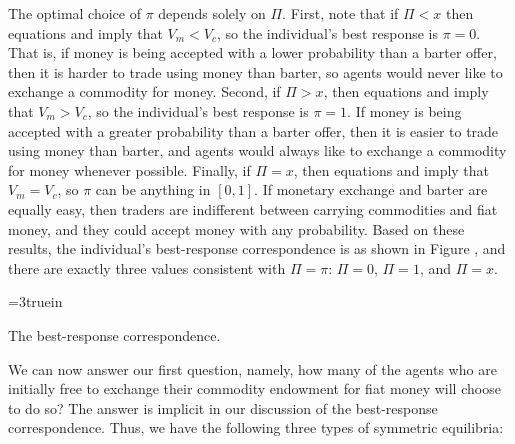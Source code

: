 The optimal choice of $\pi$ depends solely on $\Pi$. First, note
that if $\Pi<x$ then equations  and  imply that $V_m<V_c$,
so the individual's best response is $\pi=0$. That is, if money
is being accepted with a lower probability than a barter offer,
then it is harder to trade using money than barter, so agents
would never like to exchange a commodity for money. Second, if
$\Pi>x$, then equations  and  imply that $V_m>V_c$, so the
individual's best response is $\pi=1$. If money is being accepted
with a greater probability than a barter offer, then it is easier
to trade using money than barter, and agents would always like to
exchange a commodity for money whenever possible. Finally, if
$\Pi=x$, then equations  and  imply that $V_m=V_c$,
so $\pi$ can be anything in $[0, 1]$. If monetary exchange and
barter are equally easy, then traders are indifferent between carrying
commodities and fiat money, and they could accept money with
any probability. Based on these results, the individual's best-response
%
correspondence is as shown in Figure , %
and there are exactly
three values consistent with $\Pi=\pi$: $\Pi=0$, $\Pi=1$, and $\Pi=x$.


\centerline{\epsfxsize=3truein}
\caption{The best-response correspondence.}
\endfigure

We can now answer our first question, namely, how many of the agents
who are initially free to exchange their commodity endowment for fiat
money will choose to do so? The answer is implicit in our
discussion of the best-response correspondence. Thus, we have the
following three types of symmetric equilibria:

